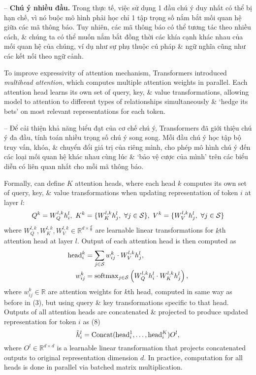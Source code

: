 \documentclass{article}
\begin{document}
\begin{itemize}
\begin{itemize}
        -- {\bf Chú ý nhiều đầu.} Trong thực tế, việc sử dụng 1 đầu chú ý duy nhất có thể bị hạn chế, vì nó buộc mô hình phải học chỉ 1 tập trọng số nắm bắt mối quan hệ giữa các mã thông báo. Tuy nhiên, các mã thông báo có thể tương tác theo nhiều cách, \& chúng ta có thể muốn nắm bắt đồng thời các khía cạnh khác nhau của mối quan hệ của chúng, ví dụ như sự phụ thuộc cú pháp \& ngữ nghĩa cũng như các kết nối theo ngữ cảnh.
        
        To improve expressivity of attention mechanism, Transformers introduced {\it multihead attention}, which computes multiple attention weights in parallel. Each attention head learns its own set of query, key, \& value transformations, allowing model to attention to different types of relationships simultaneously \& `hedge its bets' on most relevant representations for each token.
        
        -- Để cải thiện khả năng biểu đạt của cơ chế chú ý, Transformers đã giới thiệu chú ý đa đầu, tính toán nhiều trọng số chú ý song song. Mỗi đầu chú ý học tập bộ truy vấn, khóa, \& chuyển đổi giá trị của riêng mình, cho phép mô hình chú ý đến các loại mối quan hệ khác nhau cùng lúc \& `bảo vệ cược của mình' trên các biểu diễn có liên quan nhất cho mỗi mã thông báo.
        
        Formally, can define $K$ attention heads, where each head $k$ computes its own set of query, key, \& value transformations when updating representation of token $i$ at layer $l$:
        \begin{equation*}
            Q^k = W_Q^{l,k}h_i^l,\ K^k = \{W_K^{l,k}h_j^l,\ \forall j\in{\cal S}\},\ V^k = \{W_V^{l,k}h_j^l,\ \forall j\in{\cal S}\}
        \end{equation*}
        where $W_Q^{l,k},W_K^{l,k},W_V^{l,k}\in\mathbb{R}^{d\times\frac{d}{k}}$ are learnable linear transformations for $k$th attention head at layer $l$. Output of each attention head is then computed as
        \begin{align*}
            {\rm head}_i^k &= \sum_{j\in{\cal S}} w_{ij}^k\cdot W_V^{l,k}h_j^l,\\
            w_{ij}^k &= {\rm softmax}_{j\in{\cal S}}\left(W_Q^{l,k}h_i^l\cdot W_K^{l,k}h_j^l\right),
        \end{align*}
        where $w_{ij}^k\in\mathbb{R}$ are attention weights for $k$th head, computed in same way as before in (3), but using query \& key transformations specific to that head. Outputs of all attention heads are concatenated \& projected to produce updated representation for token $i$ as (8)
        \begin{equation*}
            \tilde{h}_i^l = {\rm Concat}({\rm head}_i^1,\ldots,{\rm head}_i^K)O^l,
        \end{equation*}
        where $O^l\in\mathbb{R}^{d\times d}$ is a learnable linear transformation that projects concatenated outputs to original representation dimension $d$. In practice, computation for all heads is done in parallel via batched matrix multiplication.
        

\end{itemize}
\end{itemize}
\end{document}
